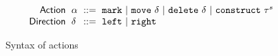\begin{figure}
  \vspace{-3px}
  \[
  \arraycolsep=3pt\begin{array}{rlrl}
      \mathsf{Action} & \action & ::= &
        \actionlit{mark} ~\vert~
        \actionlit{move}~\direction ~\vert~
        \actionlit{delete}~\direction ~\vert~
        \actionlit{construct}~\tile^s \\
      \mathsf{Direction} & \direction & ::= &
        \texttt{left} ~\vert~
        \texttt{right}
  \end{array}\]
  \caption{Syntax of actions}
  \label{fig:action-syntax}
\end{figure}
